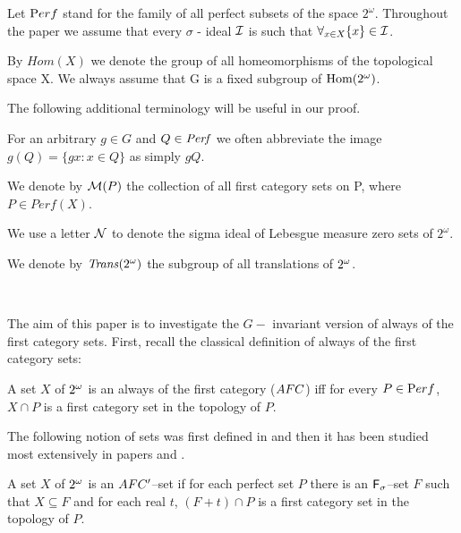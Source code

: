 Let ${\mathrm Perf}$ stand for the family of all perfect subsets of the space
$2^\omega$.
  Throughout the paper we assume that every $\sigma$ - ideal
${\cal I}$ is such that
  $\forall_{x\in X} \lbrace x \rbrace \in {\cal I}$.


  By $Hom(X)$ we denote the group of all homeomorphisms of the
topological space X.
  We always assume that G is a fixed subgroup of ${\rm Hom(2^{\omega})}$.

The following additional terminology will be useful in our proof.

  For an arbitrary $g\in G$ and $Q \in {\it Perf}$
we often abbreviate the image $g(Q) = \lbrace gx: x\in Q \rbrace$
as simply $gQ$.

  We denote by ${\cal M}(P)$ the collection of all
first category sets on P, where $P \in Perf(X)$.

  We use a letter ${\cal N}$ to denote
the sigma ideal of Lebesgue measure zero sets of $2^\omega$.

  We denote by ${\it Trans}(2^{\omega})$ the subgroup of all
translations of $2^{\omega}$. 

\bigskip
{} \\
\bigskip

The aim of this paper is to investigate the $G-$ invariant
version of always of the first category sets.
First, recall the classical definition of always of the first category sets:
\begin{definition}
A set $X$ of $2^{\omega}$ is an always of the first category ($AFC$) 
iff for every $P\in {\mathrm Perf}$, $X\cap P$ is a first category set
in the topology of $P$.
\end{definition}

The following notion of sets was first defined in \cite{NSW}
and then it has been studied most extensively in
papers \cite{NW1} and \cite{NW2}.

\begin{definition}
  A set $X$ of $2^{\omega}$ is an $AFC'$--set if for each perfect
set $P$ there is an ${\sf F}_{\sigma}$--set $F$ such that $X\subseteq F$
and for each real $t$, $(F + t)\cap P$ is a first
category set in the topology of $P$.
\end{definition}

